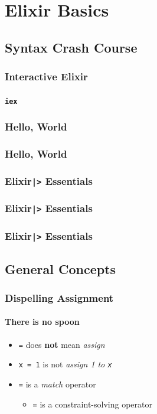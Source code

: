 \documentclass[english]{beamer}
\begin{document}
\section{Elixir Basics}

\subsection{Syntax Crash Course}
\begin{frame}[fragile]
\frametitle{Interactive Elixir}
\framesubtitle{\texttt{iex}}

\end{frame}

\begin{frame}[fragile]
\frametitle{Hello, World}

\end{frame}

\begin{frame}[fragile]
\frametitle{Hello, World}

\end{frame}

\begin{frame}[fragile]
\frametitle{Elixir\texttt{|>} Essentials}

\end{frame}

\begin{frame}[fragile]
\frametitle{Elixir\texttt{|>} Essentials}

\end{frame}

\begin{frame}[fragile]
\frametitle{Elixir\texttt{|>} Essentials}

\end{frame}

\subsection{General Concepts}
\begin{frame}
\frametitle{Dispelling Assignment}
\framesubtitle{There is no spoon}
\begin{itemize}
\item{\texttt{=} does \textbf{not} mean \textit{assign}}
\item{\texttt{x = 1} is not \textit{assign 1 to \texttt{x}}}
\item{\texttt{=} is a \textit{match} operator}
\begin{itemize}
\item{\texttt{=} is a constraint-solving operator}
\end{itemize}
\end{itemize}
\end{frame}
\end{document}
